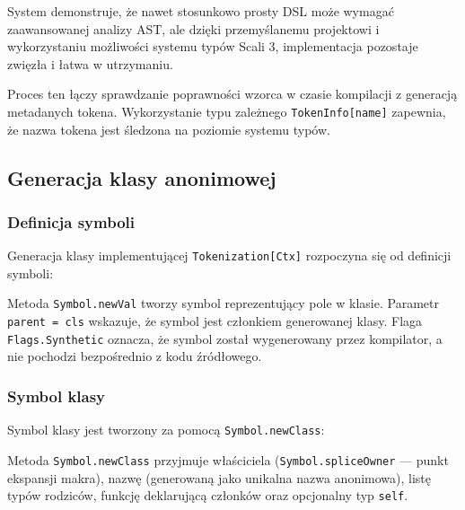 System demonstruje, że nawet stosunkowo prosty DSL może wymagać zaawansowanej analizy AST, ale dzięki przemyślanemu projektowi i wykorzystaniu możliwości systemu typów Scali 3, implementacja pozostaje zwięzła i łatwa w utrzymaniu.


Proces ten łączy sprawdzanie poprawności wzorca w czasie kompilacji z generacją metadanych tokena.
Wykorzystanie typu zależnego \texttt{TokenInfo[name]} zapewnia, że nazwa tokena jest śledzona na poziomie systemu typów.

\subsection{Generacja klasy anonimowej}\label{subsec:generacja-klasy-anonimowej}

\subsubsection{Definicja symboli}\label{subsubsec:definicja-symboli}

Generacja klasy implementującej \texttt{Tokenization[Ctx]} rozpoczyna się od definicji symboli:



Metoda \texttt{Symbol.newVal} tworzy symbol reprezentujący pole w klasie.
Parametr \texttt{parent = cls} wskazuje, że symbol jest członkiem generowanej klasy.
Flaga \texttt{Flags.Synthetic} oznacza, że symbol został wygenerowany przez kompilator, a nie pochodzi bezpośrednio z kodu źródłowego.

\subsubsection{Symbol klasy}\label{subsubsec:symbol-klasy}

Symbol klasy jest tworzony za pomocą \texttt{Symbol.newClass}:



Metoda \texttt{Symbol.newClass} przyjmuje właściciela (\texttt{Symbol.spliceOwner} — punkt ekspansji makra), nazwę (generowaną jako unikalna nazwa anonimowa), listę typów rodziców, funkcję deklarującą członków oraz opcjonalny typ \texttt{self}.

